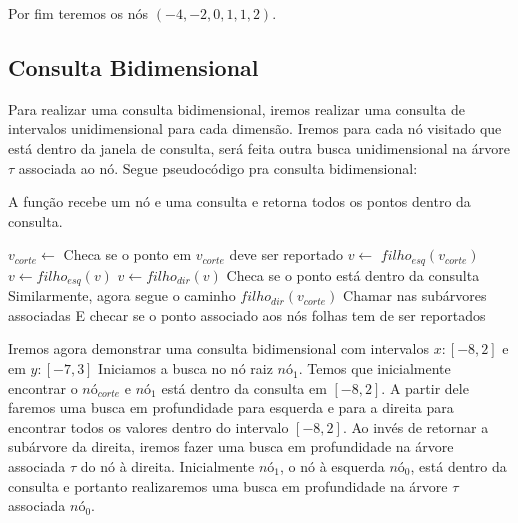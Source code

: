 Por fim teremos os nós $(-4, -2, 0, 1, 1, 2)$.

\subsection{Consulta Bidimensional}

Para realizar uma consulta bidimensional, iremos realizar uma consulta de intervalos unidimensional para
cada dimensão. 
Iremos para cada nó visitado que está dentro da janela de consulta, será feita outra busca unidimensional
na árvore $\tau$ associada ao nó.
Segue pseudocódigo pra consulta bidimensional:

\begin{algorithm}[H]
    \caption{A função  recebe um nó e uma consulta e retorna todos
    os pontos dentro da consulta.}
    \begin{algorithmic}[1]
        \State $v_{corte} \leftarrow$ 
            \State Checa se o ponto em $v_{corte}$ deve ser reportado
        \Else
            \State $v \leftarrow $ $filho_{esq}(v_{corte})$
                    \State {}
                    \State $v \leftarrow filho_{esq}(v)$
                \Else
                    \State $v \leftarrow filho_{dir}(v)$
                \EndIf
            \EndWhile
            \State Checa se o ponto está dentro da consulta
            \State Similarmente, agora segue o caminho $filho_{dir}(v_{corte})$
            \State Chamar  nas subárvores associadas
            \State E checar se o ponto associado aos nós folhas tem de ser reportados
        \EndIf
    \EndFunction
    \end{algorithmic}
\end{algorithm}
\clearpage

Iremos agora demonstrar uma consulta bidimensional com intervalos $x : [-8, 2]$ e em $y : [-7, 3]$
Iniciamos a busca no nó raiz $nó_{1}$. Temos que inicialmente encontrar o $nó_{corte}$ e $nó_{1}$ 
está dentro da consulta em $[-8, 2]$. 
A partir dele faremos uma busca em profundidade para esquerda e para a direita para encontrar todos 
os valores dentro do intervalo $[-8,2]$. 
Ao invés de retornar a subárvore da direita, iremos fazer uma busca em profundidade na árvore associada
$\tau$ do nó à direita. 
Inicialmente $nó_{1}$, o nó à esquerda $nó_{0}$, está dentro da consulta e portanto realizaremos uma
busca em profundidade na árvore $\tau$ associada $nó_{0}$.




